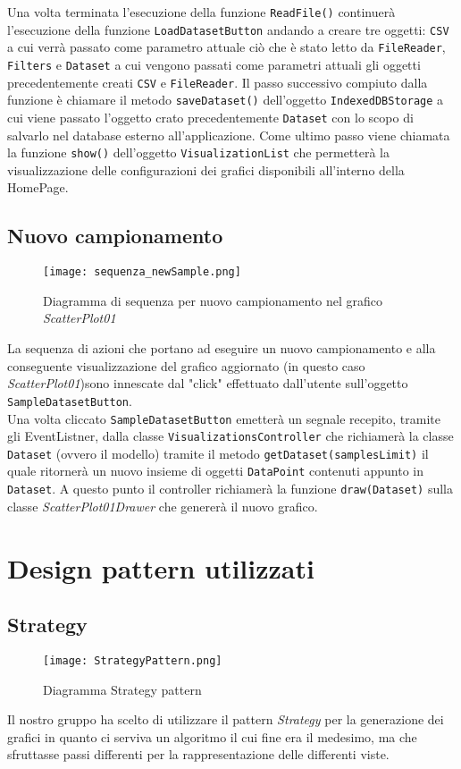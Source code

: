 Una volta terminata l'esecuzione della funzione \texttt{ReadFile()} continuerà l'esecuzione della funzione \texttt{LoadDatasetButton} andando a creare tre oggetti:
\texttt{CSV} a cui verrà passato come parametro attuale ciò che è stato letto da \texttt{FileReader}, \texttt{Filters} e \texttt{Dataset} a cui vengono passati come parametri attuali gli oggetti precedentemente creati \texttt{CSV} e \texttt{FileReader}.
Il passo successivo compiuto dalla funzione è chiamare il metodo \texttt{saveDataset()} dell'oggetto \texttt{IndexedDBStorage} a cui viene passato l'oggetto crato precedentemente \texttt{Dataset} con lo scopo di salvarlo nel database esterno all'applicazione.
Come ultimo passo viene chiamata la funzione \texttt{show()} dell'oggetto \texttt{VisualizationList} che permetterà la visualizzazione delle configurazioni dei grafici disponibili all'interno della HomePage.

\subsection{Nuovo campionamento}
\begin{figure}[H]
    \texttt{[image: sequenza\_newSample.png]}
    \caption{Diagramma di sequenza per nuovo campionamento nel grafico \textit{ScatterPlot01}}
\end{figure}
La sequenza di azioni che portano ad eseguire un nuovo campionamento e alla conseguente visualizzazione del grafico aggiornato (in questo caso \textit{ScatterPlot01})sono innescate dal "click" effettuato dall'utente sull'oggetto \texttt{SampleDatasetButton}.\\
Una volta cliccato \texttt{SampleDatasetButton} emetterà un segnale recepito, tramite gli EventListner, dalla classe \texttt{VisualizationsController} che richiamerà la classe \texttt{Dataset} (ovvero il modello) tramite il metodo \texttt{getDataset(samplesLimit)} il quale ritornerà un nuovo insieme di oggetti \texttt{DataPoint} contenuti appunto in \texttt{Dataset}. A questo punto il controller richiamerà la funzione \texttt{draw(Dataset)} sulla classe \textit{ScatterPlot01Drawer} che genererà il nuovo grafico.


\section{Design pattern utilizzati}
\subsection{Strategy}
\begin{figure}[H]
	\centering
	\texttt{[image: StrategyPattern.png]}
	\caption{Diagramma Strategy pattern}
  \end{figure}
Il nostro gruppo ha scelto di utilizzare il pattern \textit{Strategy} per la generazione dei grafici in quanto ci serviva un algoritmo il cui fine era il medesimo, ma che sfruttasse passi differenti per la rappresentazione delle differenti viste.

